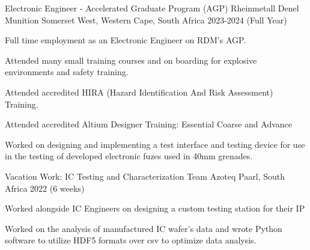 

\begin{cventries}
	

\cventry
{Electronic Engineer - Accelerated Graduate Program (AGP)} %
{Rheinmetall Denel Munition} %
{Somerset West, Western Cape, South Africa} %
{2023-2024 (Full Year)} %
{
	\begin{cvitems} %
		\item {Full time employment as an Electronic Engineer on RDM's AGP.}
		\item {Attended many small training courses and on boarding for explosive environments and safety training.}
		\item {Attended accredited HIRA (Hazard Identification And Risk Assessment) Training.}
		\item {Attended accredited Altium Designer Training: Essential Coarse and Advance}
		\item {Worked on designing and implementing a test interface and testing device for use in the testing of developed electronic fuzes used in 40mm grenades.}
	\end{cvitems}
}



  \cventry
{Vacation Work: IC Testing and Characterization Team} %
{Azoteq} %
{Paarl, South Africa} %
{2022 (6 weeks)} %
{
	\begin{cvitems} %
		\item {Worked alongside IC Engineers on designing a custom testing station for their IP}
		\item {Worked on the analysis of manufactured IC wafer's data and wrote Python software to utilize HDF5 formats over csv to optimize data analysis.}
	\end{cvitems}
}



\end{cventries}
